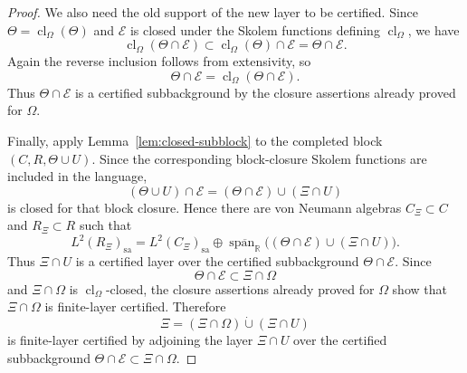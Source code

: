 \documentclass[11pt,letterpaper,reqno]{amsart}
\theoremstyle{definition}
\numberwithin{equation}{section}
\newcommand{\sa}{\mathrm{sa}}
\newcommand{\RR}{\mathbb R}
\newcommand{\cl}{\operatorname{cl}}
\DeclareMathOperator{\spanop}{span}
\begin{document}
\begin{proof}
We also need the old support of the new layer to be certified.  Since
\(\Theta=\cl_\Omega(\Theta)\) and \(\mathcal E\) is closed under the Skolem
functions defining \(\cl_\Omega\), we have
\[
   \cl_\Omega(\Theta\cap\mathcal E)
   \subset
   \cl_\Omega(\Theta)\cap\mathcal E
   =
   \Theta\cap\mathcal E.
\]
Again the reverse inclusion follows from extensivity, so
\[
   \Theta\cap\mathcal E
   =
   \cl_\Omega(\Theta\cap\mathcal E).
\]
Thus \(\Theta\cap\mathcal E\) is a certified subbackground by the closure
assertions already proved for \(\Omega\).

Finally, apply Lemma~\ref{lem:closed-subblock} to the completed block
\((C,R,\Theta\cup U)\).  Since the corresponding block-closure Skolem
functions are included in the language,
\[
   (\Theta\cup U)\cap\mathcal E
   =
   (\Theta\cap\mathcal E)\cup(\Xi\cap U)
\]
is closed for that block closure.  Hence there are von Neumann algebras
\(C_\Xi\subset C\) and \(R_\Xi\subset R\) such that
\[
   L^2(R_\Xi)_{\sa}
   =
   L^2(C_\Xi)_{\sa}
   \oplus
   \overline{\spanop_{\RR}}\bigl((\Theta\cap\mathcal E)\cup(\Xi\cap U)\bigr).
\]
Thus \(\Xi\cap U\) is a certified layer over the certified subbackground
\(\Theta\cap\mathcal E\).  Since
\[
   \Theta\cap\mathcal E\subset \Xi\cap\Omega
\]
and \(\Xi\cap\Omega\) is \(\cl_\Omega\)-closed, the closure assertions already
proved for \(\Omega\) show that \(\Xi\cap\Omega\) is finite-layer certified.
Therefore
\[
   \Xi=(\Xi\cap\Omega)\dot\cup(\Xi\cap U)
\]
is finite-layer certified by adjoining the layer \(\Xi\cap U\) over the
certified subbackground \(\Theta\cap\mathcal E\subset\Xi\cap\Omega\).
\end{proof}
\end{document}
